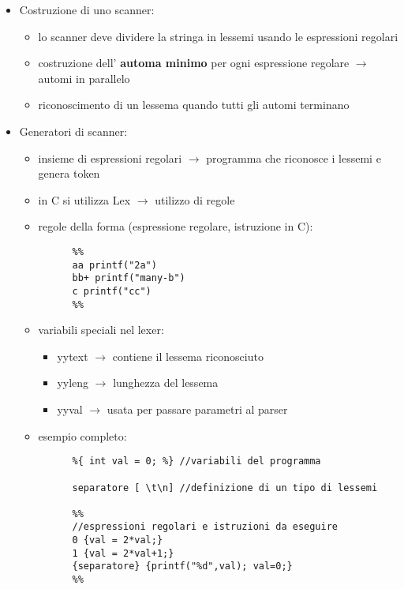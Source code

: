 \documentclass{article}
\begin{document}
\begin{itemize}
\begin{itemize}
\begin{itemize}
    \end{itemize}
  \end{itemize}
  \item Costruzione di uno scanner:
   \begin{itemize}
    \item lo scanner deve dividere la stringa in lessemi usando le espressioni regolari
    \item costruzione dell' \textbf{automa minimo} per ogni espressione regolare $\rightarrow$ automi in parallelo
    \item riconoscimento di un lessema quando tutti gli automi terminano
   \end{itemize}
  \item Generatori di scanner:
  \begin{itemize}
    \item insieme di espressioni regolari $\rightarrow$ programma che riconosce i lessemi e genera token
    \item in C si utilizza Lex $\rightarrow$ utilizzo di regole 
    \item regole della forma (espressione regolare, istruzione in C):
    \begin{lstlisting}
      %%
      aa printf("2a")
      bb+ printf("many-b")
      c printf("cc")
      %%
    \end{lstlisting}
    \item variabili speciali nel lexer:
    \begin{itemize}
      \item yytext $\rightarrow$ contiene il lessema riconosciuto
      \item yyleng $\rightarrow$ lunghezza del lessema
      \item yyval $\rightarrow$ usata per passare parametri al parser
    \end{itemize}
    \item esempio completo:
    \begin{lstlisting}
      %{ int val = 0; %} //variabili del programma
      
      separatore [ \t\n] //definizione di un tipo di lessemi
      
      %%
      //espressioni regolari e istruzioni da eseguire
      0 {val = 2*val;}
      1 {val = 2*val+1;}
      {separatore} {printf("%d",val); val=0;}
      %%
  \end{lstlisting}
  \end{itemize}
\end{itemize}
\end{document}
